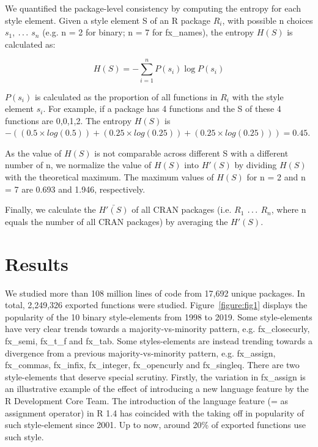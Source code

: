 We quantified the package-level consistency by computing the entropy for each style element. Given a style element S of an R package $R_{i}$, with possible n choices $s_{1}$, $\mathellipsis$ $s_{n}$ (e.g. n = 2 for binary; n = 7 for fx\_names), the entropy $H(S)$ is calculated as:

\begin{equation} \label{eqn}
H(S) = - \sum_{i = 1}^{n} P(s_{i}) \log P(s_{i})
\end{equation}

$P(s_{i})$ is calculated as the proportion of all functions in $R_{i}$ with the style element $s_{i}$. For example, if a package has 4 functions and the S of these 4 functions are {0,0,1,2}. The entropy $H(S)$ is $- ((0.5 \times log(0.5)) + (0.25 \times log(0.25)) + (0.25 \times log(0.25))) = 0.45$.

As the value of $H(S)$ is not comparable across different S with a different number of n, we normalize the value of $H(S)$ into $H'(S)$ by dividing $H(S)$ with the theoretical maximum. The maximum values of $H(S)$ for n = 2 and n = 7 are 0.693 and 1.946, respectively.

Finally, we calculate the $\bar{H'(S)}$ of all CRAN packages (i.e. $R_{1}$ $\mathellipsis$ $R_{n}$, where n equals the number of all CRAN packages) by averaging the $H'(S)$.

\section{Results}

We studied more than 108 million lines of code from 17,692 unique packages. In total, 2,249,326 exported functions were studied. Figure~\ref{figure:fig1} displays the popularity of the 10 binary style-elements from 1998 to 2019. Some style-elements have very clear trends towards a majority-vs-minority pattern, e.g. fx\_closecurly, fx\_semi, fx\_t\_f and fx\_tab. Some styles-elements are instead trending towards a divergence from a previous majority-vs-minority pattern, e.g. fx\_assign, fx\_commas, fx\_infix, fx\_integer, fx\_opencurly and fx\_singleq. There are two style-elements that deserve special scrutiny. Firstly, the variation in fx\_assign is an illustrative example of the effect of introducing a new language feature by the R Development Core Team. The introduction of the language feature (= as assignment operator) in R 1.4 \citep{chambers} has coincided with the taking off in popularity of such style-element since 2001. Up to now, around 20\% of exported functions use such style.

